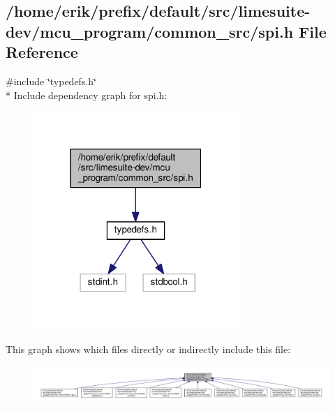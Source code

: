 \subsection{/home/erik/prefix/default/src/limesuite-\/dev/mcu\+\_\+program/common\+\_\+src/spi.h File Reference}
\label{spi_8h}
{\ttfamily \#include \char`\"{}typedefs.\+h\char`\"{}}\\*
Include dependency graph for spi.\+h\+:
\nopagebreak
\begin{figure}[H]
\begin{center}
\leavevmode
\includegraphics[width=220pt]{d9/d6b/spi_8h__incl}
\end{center}
\end{figure}
This graph shows which files directly or indirectly include this file\+:
\nopagebreak
\begin{figure}[H]
\begin{center}
\leavevmode
\includegraphics[width=350pt]{d9/da0/spi_8h__dep__incl}
\end{center}
\end{figure}
